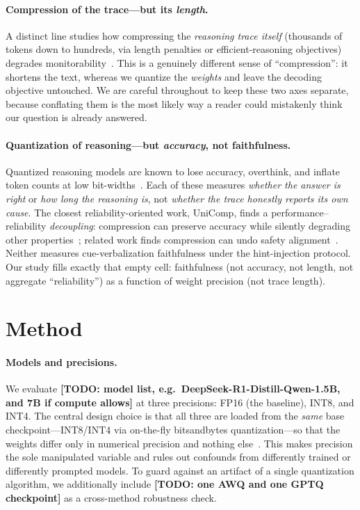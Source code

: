 \documentclass[11pt]{article}
\newcommand{\todo}[1]{{\color{red}\textbf{[TODO: #1]}}}
\begin{document}
\paragraph{Compression of the trace---but its \emph{length}.}
A distinct line studies how compressing the \emph{reasoning trace itself}
(thousands of tokens down to hundreds, via length penalties or efficient-reasoning
objectives) degrades
monitorability~\cite{monitorabilitytax2026,lengthpenalties2026}. This is a
genuinely different sense of ``compression'': it shortens the text, whereas we
quantize the \emph{weights} and leave the decoding objective untouched. We are
careful throughout to keep these two axes separate, because conflating them is
the most likely way a reader could mistakenly think our question is already
answered.

\paragraph{Quantization of reasoning---but \emph{accuracy}, not faithfulness.}
Quantized reasoning models are known to lose accuracy, overthink, and inflate
token counts at low
bit-widths~\cite{quanthurts2025,quantmeets2025,overthinking2026,tokeninflation2026,multiplicative2026,whenreasoningmeets2025}.
Each of these measures \emph{whether the answer is right} or \emph{how long the
reasoning is}, not \emph{whether the trace honestly reports its own cause}. The
closest reliability-oriented work, UniComp, finds a
performance--reliability \emph{decoupling}: compression can preserve accuracy
while silently degrading other properties~\cite{unicomp2026}; related work finds
compression can undo safety
alignment~\cite{quantundoes2026}. Neither measures cue-verbalization faithfulness
under the hint-injection protocol. Our study fills exactly that empty cell:
faithfulness (not accuracy, not length, not aggregate ``reliability'') as a
function of weight precision (not trace length).

\section{Method}
\paragraph{Models and precisions.}
We evaluate \todo{model list, e.g.\ DeepSeek-R1-Distill-Qwen-1.5B, and 7B if
compute allows} at three precisions: FP16 (the baseline), INT8, and INT4. The
central design choice is that all three are loaded from the \emph{same} base
checkpoint---INT8/INT4 via on-the-fly bitsandbytes quantization---so that the
weights differ only in numerical precision and nothing
else~\cite{dettmers2023,deepseekr1}. This makes precision the sole manipulated
variable and rules out confounds from differently trained or differently prompted
models. To guard against an artifact of a single quantization algorithm, we
additionally include \todo{one AWQ and one GPTQ checkpoint} as a cross-method
robustness check.
\end{document}
